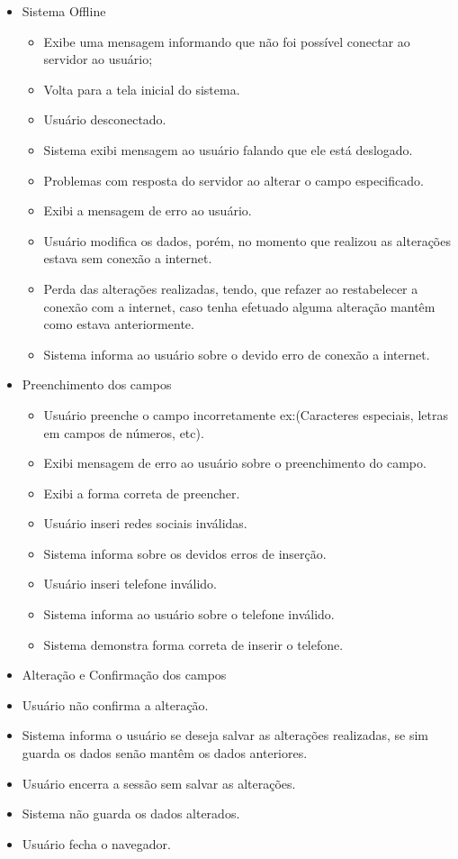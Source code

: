 {
\begin{itemize}
	\item Sistema Offline
	   \begin{itemize}	
	   	\item Exibe uma mensagem informando que não foi possível conectar ao servidor ao usuário;
		\item Volta para a tela inicial do sistema.
		\item Usuário desconectado.
		\item Sistema exibi mensagem  ao usuário falando que ele está deslogado.
		\item Problemas com resposta do servidor ao alterar o campo especificado.
		\item Exibi a mensagem de erro ao usuário.
		\item Usuário modifica os dados, porém, no momento que realizou as alterações estava sem conexão a internet.
		\item Perda das alterações realizadas, tendo, que refazer ao restabelecer a conexão com a internet, caso tenha efetuado alguma alteração mantêm como estava anteriormente.
		\item Sistema informa ao usuário sobre o devido erro de conexão a internet.
     	    \end{itemize}
	\item Preenchimento dos campos    
	    \begin{itemize}
		\item Usuário preenche o campo incorretamente ex:(Caracteres especiais, letras em campos de números, etc).
		\item Exibi mensagem de erro ao usuário sobre o preenchimento do campo.
		\item Exibi a forma correta de preencher.
		\item Usuário inseri redes sociais inválidas.
		\item Sistema informa sobre os devidos erros de inserção.
		\item Usuário inseri telefone inválido.
		\item Sistema informa ao usuário sobre o telefone inválido.
		\item Sistema demonstra forma correta de inserir o telefone.
	     \end{itemize}
	\item Alteração e Confirmação dos campos     
		\item Usuário não confirma a alteração.
		\item Sistema informa o usuário se deseja salvar as alterações realizadas, se sim guarda os dados senão mantêm os dados anteriores.
		\item Usuário encerra a sessão sem salvar as alterações.
		\item Sistema não guarda os dados alterados.
		\item Usuário fecha o navegador.
\end{itemize}
}

